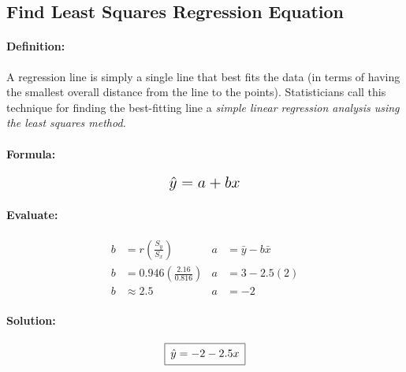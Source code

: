 \documentclass[12pt]{article}
\newcommand{\paddedBox}[1]{{\setlength\fboxsep{5pt}\boxed{#1}}}
\newcommand*{\largeMath}[1]{\mbox{\Large$#1$}}
\begin{document}
\subsection{Find Least Squares Regression Equation}
\paragraph{Definition:}
A regression line is simply a single line that best fits the data (in terms of having the smallest overall distance from the line to the points). Statisticians call this technique for finding the best-fitting line a \emph{simple linear regression analysis using the least squares method.}

\paragraph{Formula:}
\begin{equation}
	\largeMath{\hat{y} = a + bx}
\end{equation}


\paragraph{Evaluate:}
	\begin{align*}
		b &= r\left(\frac{S_{y}}{S_{x}}\right) & a &= \bar{y} - b\bar{x} \\
		b &= 0.946\left(\frac{2.16}{0.816}\right) & a &= 3 - 2.5(2) \\
		b & \approx 2.5 & a &= -2
	\end{align*}

\paragraph{Solution:}
\begin{equation*}
	\paddedBox{\hat{y} = -2 - 2.5x}
\end{equation*}
\end{document}
